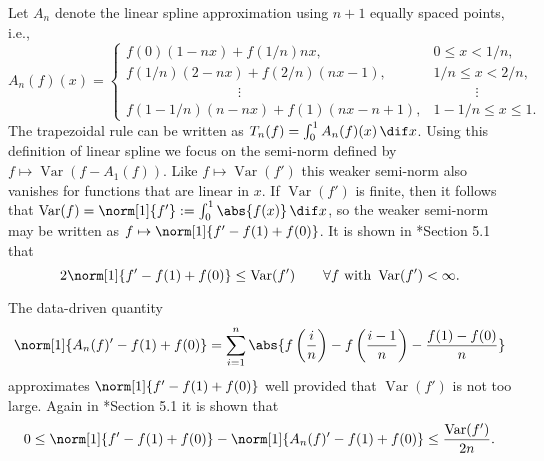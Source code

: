 \documentclass[]{article}
\DeclareMathOperator{\Var}{Var}
\theoremstyle{definition}
\theoremstyle{remark}
\begin{document}
Let $A_n$ denote the linear spline approximation using $n+1$ equally spaced points, i.e., 
\begin{equation}
\label{Andef}
A_n(f)(x) = \begin{cases} f(0)(1-nx) + f(1/n)nx, & 0 \le x < 1/n, \\
f(1/n)(2-nx) + f(2/n)(nx-1), & 1/n \le x < 2/n, \\
\qquad \qquad \qquad \qquad \vdots & \qquad \quad \vdots \\
f(1-1/n)(n-nx) + f(1)(nx-n + 1), & 1-1/n \le x \le 1.
\end{cases}
\end{equation}   
The trapezoidal rule can be written as $T_n(f) = \int_0^1 A_n(f)(x) \, \dif x$.  Using this definition of linear spline we focus on the semi-norm defined by $f \mapsto \Var(f-A_1(f))$.  Like $f \mapsto \Var(f')$ this weaker semi-norm also vanishes for functions that are linear in $x$.  If $\Var(f')$ is finite, then it follows that $\Var(f) = \norm[1]{f'}:=\int_0^1 \abs{f(x)} \, \dif x$, so the weaker semi-norm may be written as $f \mapsto \norm[1]{f'-f(1)+f(0)}$.  It is shown in *{Section 5.1} that 
\begin{equation} \label{weaknorm}
2 \norm[1]{f'-f(1)+f(0)} \le \Var(f') \qquad \forall f \text{ with } \Var(f')<\infty.
\end{equation}

The data-driven quantity 
\begin{equation} \label{weaknormalgo}
\norm[1]{A_n(f)'-f(1)+f(0)}= \sum_{i=1}^n \abs{f\left(\frac in \right)-f\left(\frac{i-1}n \right) - \frac{f(1)-f(0)}{n}}
\end{equation}
approximates $\norm[1]{f'-f(1)+f(0)}$ well provided that $\Var(f')$ is not too large. Again in *{Section 5.1} it is shown that 
\begin{equation} \label{errweaknorm}
0 \le \norm[1]{f'-f(1)+f(0)} - \norm[1]{A_n(f)'-f(1)+f(0)} \le \frac{\Var(f')}{2n}.
\end{equation}
\end{document}
